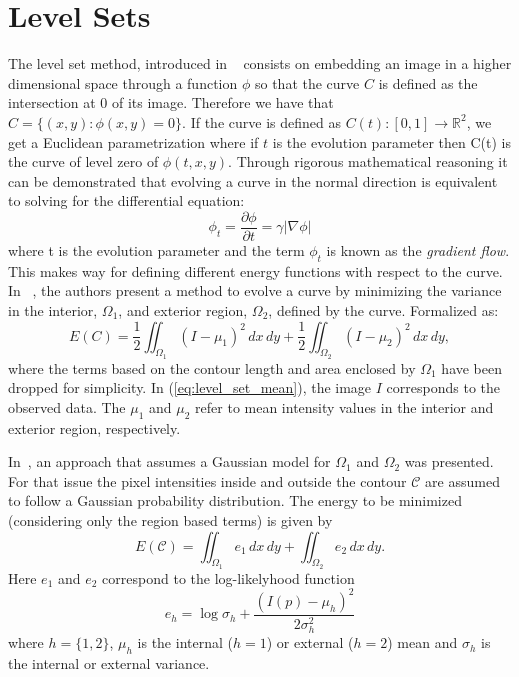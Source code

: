 \section{Level Sets}
\label{subsec:ActiveContours}
 The level set method, introduced in ~\cite{Osher198812} consists on embedding an image in a higher dimensional space through a function $\phi$ so that the curve $C$ is defined as the intersection at 0 of its image. Therefore we have that $C = \{(x, y) : \phi(x, y) = 0\}$. If the curve is defined as $C(t):[0,1]\rightarrow \mathbb{R}^2$, we get a Euclidean parametrization where if $t$ is the evolution parameter then C(t) is the curve of level zero of $\phi(t,x,y)$. Through rigorous mathematical reasoning it can be demonstrated that evolving a curve in the normal direction is equivalent to solving for the differential equation:
 \begin{equation}
 	\phi_t =\frac{\partial \phi}{\partial t}=\gamma \vert\nabla\phi\vert
 \end{equation}
 where t is the evolution parameter and the term $\phi_t$ is known as the \textit{gradient flow}.
 This makes way for defining different energy functions with respect to the curve. In ~\cite{ChanVese}, the authors present a method to evolve a curve by minimizing the variance in the interior, $\Omega_1$, and exterior region, $\Omega_2$, defined by the curve. Formalized as:
\begin{equation} \label{eq:level_set_mean}
E(C)=\frac{1}{2}\iint_{\Omega_{1}}(I-\mu_{1})^{2}\, dx\, dy+\frac{1}{2}\iint_{\Omega_{2}}(I-\mu_{2})^{2}\, dx\, dy,
\end{equation}
where the terms based on the contour length and area enclosed by $\Omega_1$
have been dropped for simplicity. In (\ref{eq:level_set_mean}), the image $I$
corresponds to the observed data. The $\mu_{1}$ and $\mu_{2}$ refer to mean
intensity values in the interior and exterior region, respectively.

In~\cite{Rousson2002}, an approach that assumes a Gaussian model for $\Omega_1$
and $\Omega_2$ was presented. For that issue the pixel intensities inside and outside the
contour $\mathcal C$ are assumed to follow a Gaussian probability distribution.
The energy to be minimized (considering only the region based terms) is given by
\begin{equation}
E(\mathcal{C})=\iint_{\Omega_{1}}e_{1}\, dx\, dy+\iint_{\Omega_{2}}e_{2}\, dx\, dy.
\label{eq:level_set_gaussian}
\end{equation}
Here $e_1$ and $e_2$ correspond to the log-likelyhood function
\begin{equation}
\label{equ:log-likelyhood}
e_{h}=\log \sigma_{h} + \frac{(I(p)-\mu_h)^2}{2\sigma_h ^2}
\end{equation}
where $h=\{1,2\}$, $\mu_h$ is the internal ($h=1$) or external ($h=2$) mean and
$\sigma_h$ is the internal or external variance.

